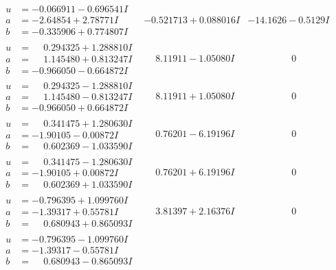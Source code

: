 \documentclass[1p]{elsarticle_modified}
\theoremstyle{definition}
\begin{document}
$$\begin{array}{c|c|c}
\begin{aligned}
u &= -0.066911 - 0.696541 I \\
a &= -2.64854 + 2.78771 I \\
b &= -0.335906 + 0.774807 I\end{aligned}
 & -0.521713 + 0.088016 I & -14.1626 - 0.5129 I \\ \hline\begin{aligned}
u &= \phantom{-}0.294325 + 1.288810 I \\
a &= \phantom{-}1.145480 + 0.813247 I \\
b &= -0.966050 - 0.664872 I\end{aligned}
 & \phantom{-}8.11911 - 1.05080 I & \phantom{-0.000000 } 0 \\ \hline\begin{aligned}
u &= \phantom{-}0.294325 - 1.288810 I \\
a &= \phantom{-}1.145480 - 0.813247 I \\
b &= -0.966050 + 0.664872 I\end{aligned}
 & \phantom{-}8.11911 + 1.05080 I & \phantom{-0.000000 } 0 \\ \hline\begin{aligned}
u &= \phantom{-}0.341475 + 1.280630 I \\
a &= -1.90105 - 0.00872 I \\
b &= \phantom{-}0.602369 - 1.033590 I\end{aligned}
 & \phantom{-}0.76201 - 6.19196 I & \phantom{-0.000000 } 0 \\ \hline\begin{aligned}
u &= \phantom{-}0.341475 - 1.280630 I \\
a &= -1.90105 + 0.00872 I \\
b &= \phantom{-}0.602369 + 1.033590 I\end{aligned}
 & \phantom{-}0.76201 + 6.19196 I & \phantom{-0.000000 } 0 \\ \hline\begin{aligned}
u &= -0.796395 + 1.099760 I \\
a &= -1.39317 + 0.55781 I \\
b &= \phantom{-}0.680943 + 0.865093 I\end{aligned}
 & \phantom{-}3.81397 + 2.16376 I & \phantom{-0.000000 } 0 \\ \hline\begin{aligned}
u &= -0.796395 - 1.099760 I \\
a &= -1.39317 - 0.55781 I \\
b &= \phantom{-}0.680943 - 0.865093 I\end{aligned}

\end{array}$$
\end{document}
